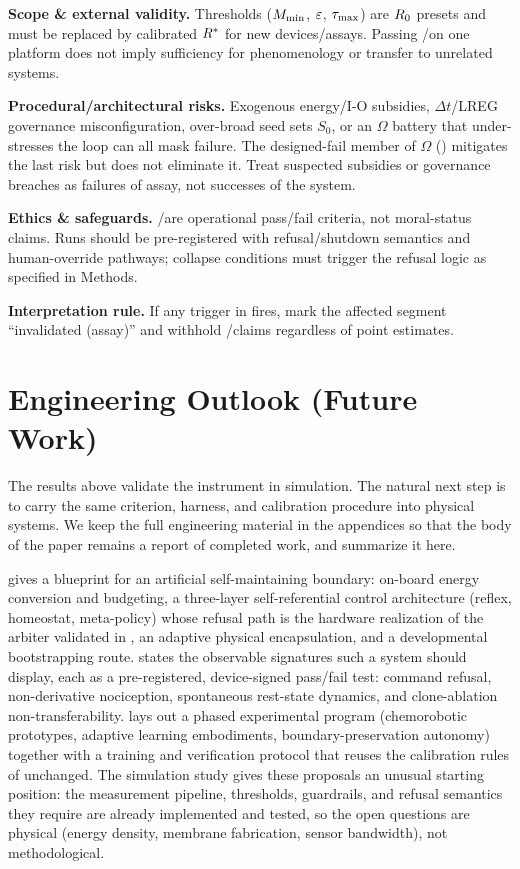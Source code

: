 \documentclass[11pt]{article}
\begin{document}
\textbf{Scope \& external validity.} Thresholds ($M_{\min}$, $\varepsilon$, $\tau_{\max}$) are $R_0$ presets and must be replaced by calibrated $R^*$ for new devices/assays. Passing \NC/\SC on one platform does not imply sufficiency for phenomenology or transfer to unrelated systems.

\textbf{Procedural/architectural risks.} Exogenous energy/I-O subsidies, $\Delta t$/LREG governance misconfiguration, over-broad seed sets $S_0$, or an $\Omega$ battery that under-stresses the loop can all mask failure. The designed-fail member of $\Omega$ () mitigates the last risk but does not eliminate it. Treat suspected subsidies or governance breaches as failures of assay, not successes of the system.

\textbf{Ethics \& safeguards.} \NC/\SC are operational pass/fail criteria, not moral-status claims. Runs should be pre-registered with refusal/shutdown semantics and human-override pathways; collapse conditions must trigger the refusal logic as specified in Methods.

\textbf{Interpretation rule.} If any trigger in  fires, mark the affected segment ``invalidated (assay)'' and withhold \NC/\SC claims regardless of point estimates.

\section{Engineering Outlook (Future Work)}
\label{sec:outlook}

The results above validate the instrument in simulation. The natural next step is to carry the same criterion, harness, and calibration procedure into physical systems. We keep the full engineering material in the appendices so that the body of the paper remains a report of completed work, and summarize it here.

 gives a blueprint for an artificial self-maintaining boundary: on-board energy conversion and budgeting, a three-layer self-referential control architecture (reflex, homeostat, meta-policy) whose refusal path is the hardware realization of the arbiter validated in , an adaptive physical encapsulation, and a developmental bootstrapping route.  states the observable signatures such a system should display, each as a pre-registered, device-signed pass/fail test: command refusal, non-derivative nociception, spontaneous rest-state dynamics, and clone-ablation non-transferability.  lays out a phased experimental program (chemorobotic prototypes, adaptive learning embodiments, boundary-preservation autonomy) together with a training and verification protocol that reuses the calibration rules of  unchanged. The simulation study gives these proposals an unusual starting position: the measurement pipeline, thresholds, guardrails, and refusal semantics they require are already implemented and tested, so the open questions are physical (energy density, membrane fabrication, sensor bandwidth), not methodological.
\end{document}
